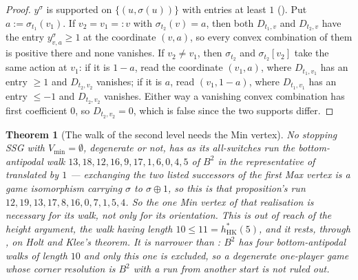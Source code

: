 \documentclass[11pt]{article}
\theoremstyle{plain}
\newtheorem{theorem}{Theorem}[section]
\theoremstyle{definition}
\newcommand{\Vmin}{V_{\min}}
\begin{document}
\begin{proof}
$y^{\sigma}$ is supported on $\{(u,\sigma(u))\}$ with entries at least $1$
(). Put $a:=\sigma_{t_1}(v_1)$. If $v_2=v_1=:v$
with $\sigma_{t_2}(v)=a$, then both $D_{t_1,v}$ and $D_{t_2,v}$ have the
entry $y^{\sigma}_{v,a}\ge1$ at the coordinate $(v,a)$, so every convex
combination of them is positive there and none vanishes. If $v_2\ne v_1$,
then $\sigma_{t_2}$ and
$\sigma_{t_2}[v_2]$ take the same action at $v_1$: if it is $1-a$, read
the coordinate $(v_1,a)$, where $D_{t_1,v_1}$ has an entry $\ge1$ and
$D_{t_2,v_2}$ vanishes; if it is $a$, read $(v_1,1-a)$, where
$D_{t_1,v_1}$ has an entry $\le-1$ and $D_{t_2,v_2}$ vanishes. Either way
a vanishing convex combination has first coefficient $0$, so
$D_{t_2,v_2}=0$, which is false since the two supports differ.
\end{proof}

\begin{theorem}[The walk of the second level needs the Min vertex]\label{thm:b2-walk}
No stopping SSG with $\Vmin=\emptyset$, degenerate or not, has as its
all-switches run the bottom-antipodal walk
$13,18,12,16,9,17,1,6,0,4,5$ of $B^{2}$ in the representative of
 translated by $1$ --- exchanging the two listed
successors of the first Max vertex is a game isomorphism carrying
$\sigma$ to $\sigma\oplus1$, so this is that proposition's run
$12,19,13,17,8,16,0,7,1,5,4$. So the one Min vertex of that
realisation is necessary for its walk, not only for its orientation.
This is out of reach of the height argument, the walk having length
$10\le11=h^{\ast}_{\mathrm{HK}}(5)$, and it rests, through
, on Holt and Klee's theorem. It is narrower than
: $B^{2}$ has four bottom-antipodal walks of length
$10$ and only this one is excluded, so a degenerate one-player game whose
corner resolution is $B^{2}$ with a run from another start is not ruled
out.
\end{theorem}
\end{document}
